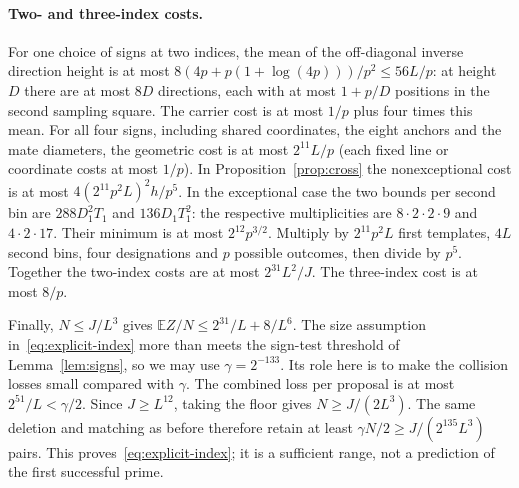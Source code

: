 \paragraph{Two- and three-index costs.} For one choice of signs at two indices, the mean of the off-diagonal inverse direction height is at most $8(4p+p(1+\log(4p)))/p^2\le56L/p$: at height $D$ there are at most $8D$ directions, each with at most $1+p/D$ positions in the second sampling square. The carrier cost is at most $1/p$ plus four times this mean. For all four signs, including shared coordinates, the eight anchors and the mate diameters, the geometric cost is at most $2^{11}L/p$ (each fixed line or coordinate costs at most $1/p$). In Proposition~\ref{prop:cross} the nonexceptional cost is at most $4(2^{11}p^2L)^2h/p^5$. In the exceptional case the two bounds per second bin are $288D_1^2T_1$ and $136D_1T_1^2$: the respective multiplicities are $8\cdot2\cdot2\cdot9$ and $4\cdot2\cdot17$. Their minimum is at most $2^{12}p^{3/2}$. Multiply by $2^{11}p^2L$ first templates, $4L$ second bins, four designations and $p$ possible outcomes, then divide by $p^5$. Together the two-index costs are at most $2^{31}L^2/J$. The three-index cost is at most $8/p$.

Finally, $N\le J/L^3$ gives $\mathbb E Z/N\le2^{31}/L+8/L^6$. The size assumption in~\eqref{eq:explicit-index} more than meets the sign-test threshold of Lemma~\ref{lem:signs}, so we may use $\gamma=2^{-133}$. Its role here is to make the collision losses small compared with $\gamma$. The combined loss per proposal is at most $2^{51}/L<\gamma/2$. Since $J\ge L^{12}$, taking the floor gives $N\ge J/(2L^3)$. The same deletion and matching as before therefore retain at least $\gamma N/2\ge J/(2^{135}L^3)$ pairs. This proves~\eqref{eq:explicit-index}; it is a sufficient range, not a prediction of the first successful prime.
